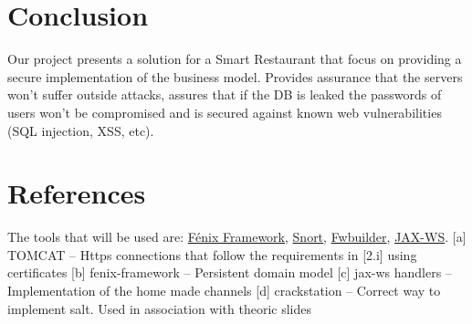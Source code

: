 \documentclass[12pt,paper=a4]{article}
\begin{document}
\section{Conclusion}
Our project presents a solution for a Smart Restaurant that focus on providing a secure implementation of the business model. Provides assurance that the servers won’t suffer outside attacks, assures that if the DB is leaked the passwords of users won’t be compromised and is secured against known web vulnerabilities (SQL injection, XSS, etc).
\section{References}
The tools that will be used are: \href{https://fenix-framework.github.io/}{Fénix Framework}, \href{https://www.snort.org/}{Snort}, \href{http://www.fwbuilder.org/}{Fwbuilder}, \href{https://jax-ws.java.net/}{JAX-WS}.
[a] TOMCAT – Https connections that follow the requirements in [2.i] using certificates
[b] fenix-framework – Persistent domain model 
[c] jax-ws handlers – Implementation of the home made channels
[d] crackstation – Correct way to implement salt. Used in association with theoric slides
\end{document}
